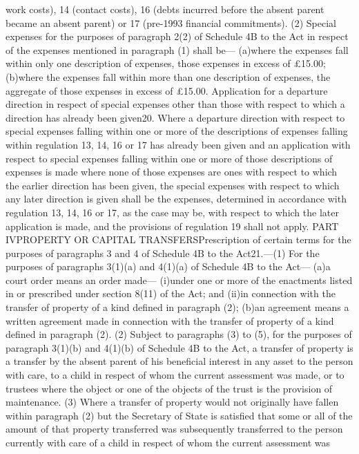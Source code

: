 \documentclass[a4paper]{article}
\begin{document}
work costs), 14 (contact costs), 16 (debts incurred before the absent parent
became an absent parent) or 17 (pre-1993 financial commitments).
(2) Special expenses for the purposes of paragraph 2(2) of Schedule 4B to the
Act in respect of the expenses mentioned in paragraph (1) shall be—
(a)where the expenses fall within only one description of expenses, those
expenses in excess of £15.00;
(b)where the expenses fall within more than one description of expenses, the
aggregate of those expenses in excess of £15.00.
Application for a departure direction in respect of special expenses other than
those with respect to which a direction has already been given20. Where a
departure direction with respect to special expenses falling within one or more
of the descriptions of expenses falling within regulation 13, 14, 16 or 17 has
already been given and an application with respect to special expenses falling
within one or more of those descriptions of expenses is made where none of those
expenses are ones with respect to which the earlier direction has been given,
the special expenses with respect to which any later direction is given shall be
the expenses, determined in accordance with regulation 13, 14, 16 or 17, as the
case may be, with respect to which the later application is made, and the
provisions of regulation 19 shall not apply.
PART IVPROPERTY OR CAPITAL TRANSFERSPrescription of certain terms for the
purposes of paragraphs 3 and 4 of Schedule 4B to the Act21.—(1) For the purposes
of paragraphs 3(1)(a) and 4(1)(a) of Schedule 4B to the Act—
(a)a court order means an order made—
(i)under one or more of the enactments listed in or prescribed under section
8(11) of the Act; and
(ii)in connection with the transfer of property of a kind defined in paragraph
(2);
(b)an agreement means a written agreement made in connection with the transfer
of property of a kind defined in paragraph (2).
(2) Subject to paragraphs (3) to (5), for the purposes of paragraph 3(1)(b) and
4(1)(b) of Schedule 4B to the Act, a transfer of property is a transfer by the
absent parent of his beneficial interest in any asset to the person with care,
to a child in respect of whom the current assessment was made, or to trustees
where the object or one of the objects of the trust is the provision of
maintenance.
(3) Where a transfer of property would not originally have fallen within
paragraph (2) but the Secretary of State is satisfied that some or all of the
amount of that property transferred was subsequently transferred to the person
currently with care of a child in respect of whom the current assessment was
\end{document}

